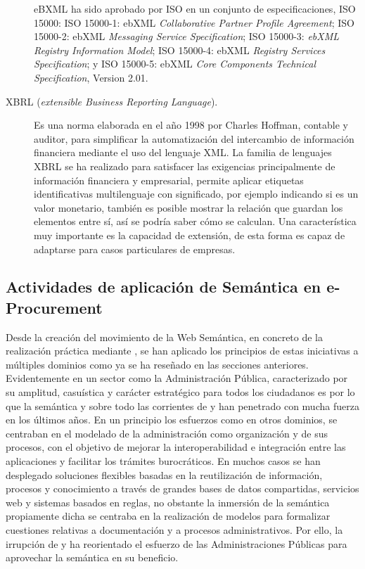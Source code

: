 \begin{description}
eBXML ha sido aprobado por \gls{ISO} en un conjunto de especificaciones, ISO 15000:  ISO 15000-1: ebXML \textit{Collaborative Partner Profile Agreement};
ISO 15000-2: ebXML \textit{Messaging Service Specification}; ISO 15000-3: \textit{ebXML Registry Information Model}; ISO 15000-4: ebXML \textit{Registry Services Specification};
y ISO 15000-5: ebXML \textit{Core Components Technical Specification}, Version 2.01.

\item [\gls{XBRL} (\textit{extensible Business Reporting Language}).] 
Es una norma elaborada en el año 1998 por Charles Hoffman, contable y auditor, para
simplificar la automatización del intercambio de información financiera mediante
el uso del lenguaje XML. La familia de lenguajes XBRL se ha realizado para
satisfacer las exigencias principalmente de información financiera y
empresarial, permite aplicar etiquetas identificativas multilenguaje con
significado, por ejemplo indicando si es un valor monetario, también es posible
mostrar la relación que guardan los elementos entre sí, así se podría saber cómo se
calculan. Una característica muy importante es la capacidad de extensión, de
esta forma es capaz de adaptarse para casos particulares de empresas. 

\end{description}

\subsection{Actividades de aplicación de Semántica en e-Procurement}
Desde la creación del movimiento de la Web Semántica, en concreto de la realización
práctica mediante \linkeddata, se han aplicado los principios de estas iniciativas a múltiples
dominios como ya se ha reseñado en las secciones anteriores. Evidentemente en un sector como 
la Administración Pública, caracterizado por su amplitud, casuística y carácter estratégico para todos los ciudadanos
es por lo que la semántica y sobre todo las corrientes de \opendata y \linkeddata han penetrado con mucha fuerza en los últimos años. 
En un principio los esfuerzos como en otros dominios, se centraban en el modelado de la administración
como organización y de sus procesos, con el objetivo de mejorar la interoperabilidad e integración
entre las aplicaciones y facilitar los trámites burocráticos. En muchos casos se han desplegado
soluciones flexibles basadas en la reutilización de información, procesos y conocimiento a través
de grandes bases de datos compartidas, servicios web y sistemas basados en reglas, no obstante la inmersión
de la semántica propiamente dicha se centraba en la realización de modelos para formalizar
cuestiones relativas a documentación y a procesos administrativos. Por ello,
la irrupción de \opendata y \linkeddata ha reorientado el esfuerzo de las Administraciones Públicas
para aprovechar la semántica en su beneficio. 


